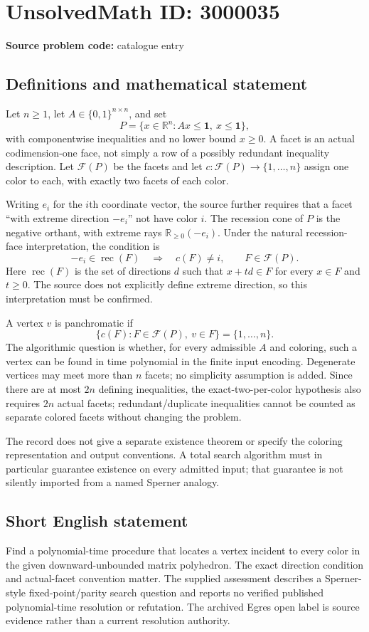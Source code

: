 \documentclass[11pt]{article}
\newcommand{\R}{\mathbb{R}}
\begin{document}
\section*{UnsolvedMath ID: 3000035}
\textbf{Source problem code:} catalogue entry
\subsection{Definitions and mathematical statement}
Let $n\geq1$, let $A\in\{0,1\}^{n\times n}$, and set
\[
 P=\{x\in\R^n:Ax\leq\mathbf1,\ x\leq\mathbf1\},
\]
with componentwise inequalities and no lower bound $x\geq0$. A facet is an actual codimension-one face, not simply a row of a possibly redundant inequality description. Let $\mathcal F(P)$ be the facets and let $c:\mathcal F(P)\to\{1,\ldots,n\}$ assign one color to each, with exactly two facets of each color.

Writing $e_i$ for the $i$th coordinate vector, the source further requires that a facet ``with extreme direction $-e_i$'' not have color $i$. The recession cone of $P$ is the negative orthant, with extreme rays $\R_{\geq0}(-e_i)$. Under the natural recession-face interpretation, the condition is
\[
 -e_i\in\operatorname{rec}(F)\quad\Longrightarrow\quad c(F)\ne i,
 \qquad F\in\mathcal F(P).
\]
Here $\operatorname{rec}(F)$ is the set of directions $d$ such that $x+td\in F$ for every $x\in F$ and $t\geq0$. The source does not explicitly define extreme direction, so this interpretation must be confirmed.

A vertex $v$ is panchromatic if
\[
 \{c(F):F\in\mathcal F(P),\ v\in F\}=\{1,\ldots,n\}.
\]
The algorithmic question is whether, for every admissible $A$ and coloring, such a vertex can be found in time polynomial in the finite input encoding. Degenerate vertices may meet more than $n$ facets; no simplicity assumption is added. Since there are at most $2n$ defining inequalities, the exact-two-per-color hypothesis also requires $2n$ actual facets; redundant/duplicate inequalities cannot be counted as separate colored facets without changing the problem.

The record does not give a separate existence theorem or specify the coloring representation and output conventions. A total search algorithm must in particular guarantee existence on every admitted input; that guarantee is not silently imported from a named Sperner analogy.
\subsection{Short English statement}
Find a polynomial-time procedure that locates a vertex incident to every color in the given downward-unbounded matrix polyhedron. The exact direction condition and actual-facet convention matter. The supplied assessment describes a Sperner-style fixed-point/parity search question and reports no verified published polynomial-time resolution or refutation. The archived Egres open label is source evidence rather than a current resolution authority.
\end{document}
